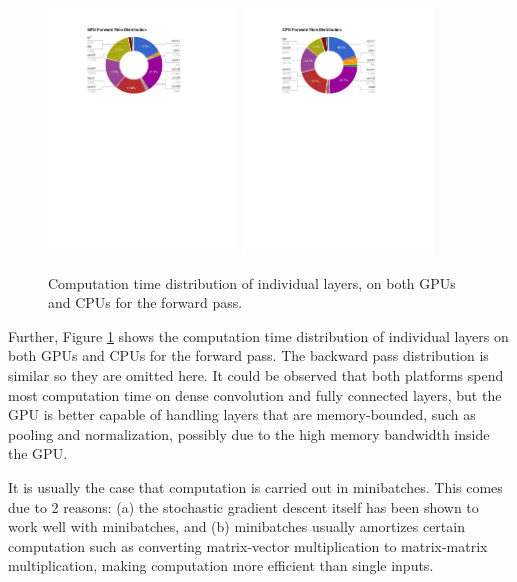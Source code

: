 \begin{figure}
  \centering
  \includegraphics[width=0.45\textwidth]{figs/caffe/gpu_forward_distribution.pdf}%
  \includegraphics[width=0.45\textwidth]{figs/caffe/cpu_forward_distribution.pdf}
  \caption{Computation time distribution of individual layers, on both GPUs and CPUs for the forward pass.}\label{fig:caffe:perlayer}
\end{figure}

Further, Figure \ref{fig:caffe:perlayer} shows the computation time distribution of individual layers on both GPUs and CPUs for the forward pass. The backward pass distribution is similar so they are omitted here. It could be observed that both platforms spend most computation time on dense convolution and fully connected layers, but the GPU is better capable of handling layers that are memory-bounded, such as pooling and normalization, possibly due to the high memory bandwidth inside the GPU.

It is usually the case that computation is carried out in minibatches. This comes due to 2 reasons: (a) the stochastic gradient descent itself has been shown to work well with minibatches, and (b) minibatches usually amortizes certain computation such as converting matrix-vector multiplication to matrix-matrix multiplication, making computation more efficient than single inputs.

